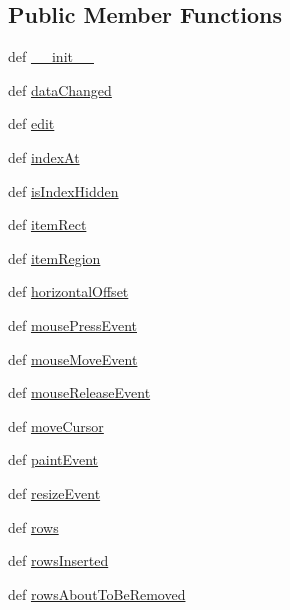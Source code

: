 \subsection*{Public Member Functions}
\begin{DoxyCompactItemize}
\item 
def \hyperlink{classchart_1_1PieView_a709a8b62a773d5370920bbd6add1e669}{\+\_\+\+\_\+init\+\_\+\+\_\+}
\item 
def \hyperlink{classchart_1_1PieView_a60bfd7d3176b370ebb245261c7239adb}{data\+Changed}
\item 
def \hyperlink{classchart_1_1PieView_a07e92cfe40c46153c2f3d05c70b156b0}{edit}
\item 
def \hyperlink{classchart_1_1PieView_a5746997a9c4b39abd833f1d10b64c962}{index\+At}
\item 
def \hyperlink{classchart_1_1PieView_aebb6ca3d1274ccf84ee5b6493c011ac4}{is\+Index\+Hidden}
\item 
def \hyperlink{classchart_1_1PieView_a62e8325d703ba295aced16209c2e9fd9}{item\+Rect}
\item 
def \hyperlink{classchart_1_1PieView_a202f0f650eb05bb66ff2f4f297ad43b2}{item\+Region}
\item 
def \hyperlink{classchart_1_1PieView_a319b9b81e262dabc00e3ca2825ebe120}{horizontal\+Offset}
\item 
def \hyperlink{classchart_1_1PieView_a7d0c52a5877b66aca4ba4d2fa2965ee3}{mouse\+Press\+Event}
\item 
def \hyperlink{classchart_1_1PieView_a6f045dacf87f0a4fbc4a351bec69bffa}{mouse\+Move\+Event}
\item 
def \hyperlink{classchart_1_1PieView_a6a554aa94b07609950e6869d30921811}{mouse\+Release\+Event}
\item 
def \hyperlink{classchart_1_1PieView_a062fcc17df3b155d4eec1196c49726ae}{move\+Cursor}
\item 
def \hyperlink{classchart_1_1PieView_adaecf4652ba9bd0d59db6ccefa762d46}{paint\+Event}
\item 
def \hyperlink{classchart_1_1PieView_a9c93b29d3f7e9ea94c1843d7322ca2d9}{resize\+Event}
\item 
def \hyperlink{classchart_1_1PieView_a2292b8652adf1219190649871c2803ca}{rows}
\item 
def \hyperlink{classchart_1_1PieView_a70ee78dd69ab61e47d8fed1c21084453}{rows\+Inserted}
\item 
def \hyperlink{classchart_1_1PieView_aa99a57eb908af2cc3177ee3a1c0daac9}{rows\+About\+To\+Be\+Removed}
\item 

\end{DoxyCompactItemize}
